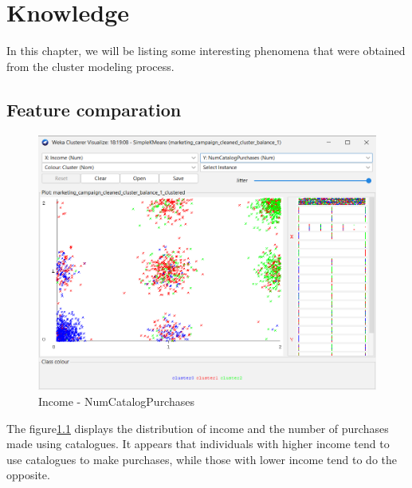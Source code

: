 \chapter{Knowledge}

In this chapter, we will be listing some interesting phenomena that were obtained from the cluster modeling process.

\section{Feature comparation}



\begin{figure}[H]
  \includegraphics[scale=0.6]{imgs/cluster_income_catalog}
  \centering
  \caption{Income - NumCatalogPurchases}
  \label{NumCatalogPurchases}
\end{figure}

The figure\ref{NumCatalogPurchases} displays the distribution of income and the number of purchases made using catalogues. It appears that individuals with higher income tend to use catalogues to make purchases, while those with lower income tend to do the opposite.


